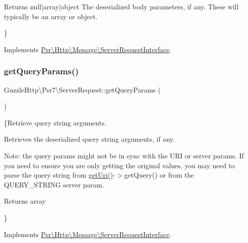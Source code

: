 \begin{DoxyReturn}{Returns}
null$\vert$array$\vert$object The deserialized body parameters, if any. These will typically be an array or object.
\end{DoxyReturn}
\} 

Implements \hyperlink{interfacePsr_1_1Http_1_1Message_1_1ServerRequestInterface_adea56ff4819890170ede9220c25cfbb1}{Psr\textbackslash{}\+Http\textbackslash{}\+Message\textbackslash{}\+Server\+Request\+Interface}.

\mbox{\label{classGuzzleHttp_1_1Psr7_1_1ServerRequest_ad516a9f552dedb6d4e92cbfe81269ec0}} 
\subsubsection{\texorpdfstring{get\+Query\+Params()}{getQueryParams()}}
{\footnotesize\ttfamily Guzzle\+Http\textbackslash{}\+Psr7\textbackslash{}\+Server\+Request\+::get\+Query\+Params (\begin{DoxyParamCaption}{ }\end{DoxyParamCaption})}

\{Retrieve query string arguments.

Retrieves the deserialized query string arguments, if any.

Note\+: the query params might not be in sync with the U\+RI or server params. If you need to ensure you are only getting the original values, you may need to parse the query string from {\ttfamily \hyperlink{interfacePsr_1_1Http_1_1Message_1_1RequestInterface_a179c55f570319eb0736f9a8209c9cac6}{get\+Uri()}-\/$>$get\+Query()} or from the {\ttfamily Q\+U\+E\+R\+Y\+\_\+\+S\+T\+R\+I\+NG} server param.

\begin{DoxyReturn}{Returns}
array
\end{DoxyReturn}
\} 

Implements \hyperlink{interfacePsr_1_1Http_1_1Message_1_1ServerRequestInterface_af4fa67cf103fab09a968c650abea76f2}{Psr\textbackslash{}\+Http\textbackslash{}\+Message\textbackslash{}\+Server\+Request\+Interface}.

\mbox{\label{classGuzzleHttp_1_1Psr7_1_1ServerRequest_a3c3cfb1da1fa12c52fec0c5f8549c4fb}} 
